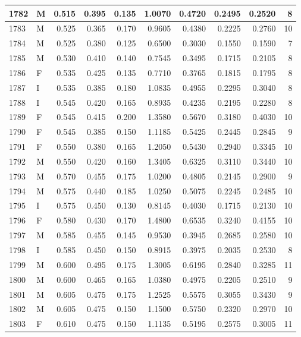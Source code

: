 \documentclass[9pt,twocolumn,twoside,]{pnas-new}
\begin{document}
\begin{tabular}{l|l|r|r|r|r|r|r|r|r}
\hline
1782 & M & 0.515 & 0.395 & 0.135 & 1.0070 & 0.4720 & 0.2495 & 0.2520 & 8\\
\hline
1783 & M & 0.525 & 0.365 & 0.170 & 0.9605 & 0.4380 & 0.2225 & 0.2760 & 10\\
\hline
1784 & M & 0.525 & 0.380 & 0.125 & 0.6500 & 0.3030 & 0.1550 & 0.1590 & 7\\
\hline
1785 & M & 0.530 & 0.410 & 0.140 & 0.7545 & 0.3495 & 0.1715 & 0.2105 & 8\\
\hline
1786 & F & 0.535 & 0.425 & 0.135 & 0.7710 & 0.3765 & 0.1815 & 0.1795 & 8\\
\hline
1787 & I & 0.535 & 0.385 & 0.180 & 1.0835 & 0.4955 & 0.2295 & 0.3040 & 8\\
\hline
1788 & I & 0.545 & 0.420 & 0.165 & 0.8935 & 0.4235 & 0.2195 & 0.2280 & 8\\
\hline
1789 & F & 0.545 & 0.415 & 0.200 & 1.3580 & 0.5670 & 0.3180 & 0.4030 & 10\\
\hline
1790 & F & 0.545 & 0.385 & 0.150 & 1.1185 & 0.5425 & 0.2445 & 0.2845 & 9\\
\hline
1791 & F & 0.550 & 0.380 & 0.165 & 1.2050 & 0.5430 & 0.2940 & 0.3345 & 10\\
\hline
1792 & M & 0.550 & 0.420 & 0.160 & 1.3405 & 0.6325 & 0.3110 & 0.3440 & 10\\
\hline
1793 & M & 0.570 & 0.455 & 0.175 & 1.0200 & 0.4805 & 0.2145 & 0.2900 & 9\\
\hline
1794 & M & 0.575 & 0.440 & 0.185 & 1.0250 & 0.5075 & 0.2245 & 0.2485 & 10\\
\hline
1795 & I & 0.575 & 0.450 & 0.130 & 0.8145 & 0.4030 & 0.1715 & 0.2130 & 10\\
\hline
1796 & F & 0.580 & 0.430 & 0.170 & 1.4800 & 0.6535 & 0.3240 & 0.4155 & 10\\
\hline
1797 & M & 0.585 & 0.455 & 0.145 & 0.9530 & 0.3945 & 0.2685 & 0.2580 & 10\\
\hline
1798 & I & 0.585 & 0.450 & 0.150 & 0.8915 & 0.3975 & 0.2035 & 0.2530 & 8\\
\hline
1799 & M & 0.600 & 0.495 & 0.175 & 1.3005 & 0.6195 & 0.2840 & 0.3285 & 11\\
\hline
1800 & M & 0.600 & 0.465 & 0.165 & 1.0380 & 0.4975 & 0.2205 & 0.2510 & 9\\
\hline
1801 & M & 0.605 & 0.475 & 0.175 & 1.2525 & 0.5575 & 0.3055 & 0.3430 & 9\\
\hline
1802 & M & 0.605 & 0.475 & 0.150 & 1.1500 & 0.5750 & 0.2320 & 0.2970 & 10\\
\hline
1803 & F & 0.610 & 0.475 & 0.150 & 1.1135 & 0.5195 & 0.2575 & 0.3005 & 11\\

\end{tabular}
\end{document}
